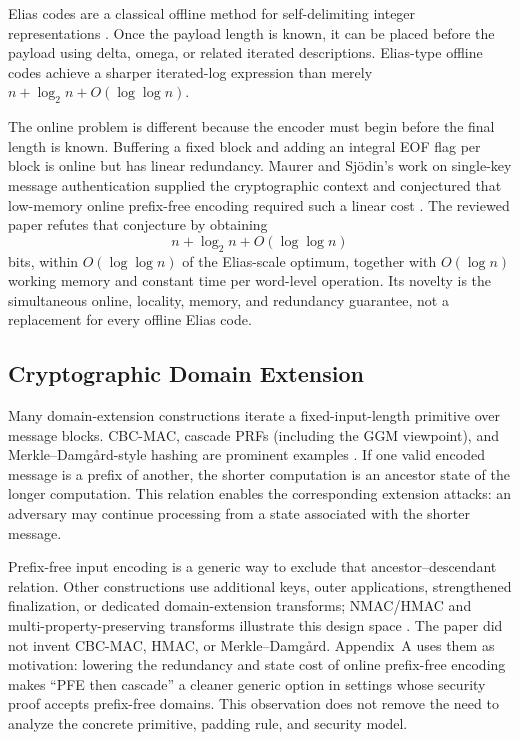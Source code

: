 Elias codes are a classical offline method for self-delimiting integer
representations \cite{elias1975universal}.  Once the payload length
is known, it can be placed before the payload using delta, omega, or related
iterated descriptions.  Elias-type offline codes achieve a sharper
iterated-log expression than merely
\(n+\log_2n+O(\log\log n)\).

The online problem is different because the encoder must begin before the
final length is known.  Buffering a fixed block and adding an integral EOF
flag per block is online but has linear redundancy.  Maurer and Sj\"odin's
work on single-key message authentication supplied the cryptographic context
and conjectured that low-memory online prefix-free encoding required such a
linear cost \cite{maurer2005single}.  The reviewed paper refutes that
conjecture by obtaining
\[
    n+\log_2n+O(\log\log n)
\]
bits, within \(O(\log\log n)\) of the Elias-scale optimum, together with
\(O(\log n)\) working memory and constant time per word-level operation.  Its
novelty is the simultaneous online, locality, memory, and redundancy
guarantee, not a replacement for every offline Elias code.

\subsection{Cryptographic Domain Extension}

Many domain-extension constructions iterate a fixed-input-length primitive
over message blocks.  CBC-MAC, cascade PRFs (including the GGM viewpoint),
and Merkle--Damg\aa rd-style hashing are prominent examples
\cite{bellare1994security,bellare1996cascade,goldreich1986random,coron2005merkle}.
If one valid encoded message is a prefix of another, the shorter computation
is an ancestor state of the longer computation.  This relation enables the
corresponding extension attacks: an adversary may continue processing from a
state associated with the shorter message.

Prefix-free input encoding is a generic way to exclude that
ancestor--descendant relation.  Other constructions use additional keys,
outer applications, strengthened finalization, or dedicated domain-extension
transforms; NMAC/HMAC and multi-property-preserving transforms illustrate
this design space \cite{bellare1996keying,bellare2006multiproperty}.  The
paper did not invent CBC-MAC, HMAC, or Merkle--Damg\aa rd.  Appendix~A uses
them as motivation: lowering the redundancy and state cost of online
prefix-free encoding makes ``PFE then cascade'' a cleaner generic option in
settings whose security proof accepts prefix-free domains.  This observation
does not remove the need to analyze the concrete primitive, padding rule, and
security model.

